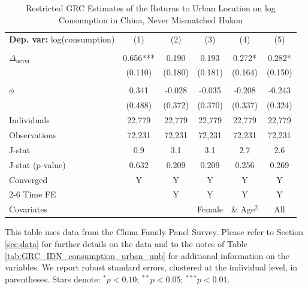 \begin{table}[htbp] \centering \begin{threeparttable}
 \caption{Restricted GRC Estimates of the Returns to Urban Location on log Consumption in China, Never Mismatched Hukou} 
 \label{tab:GRC_CHN_nomis_consumption_urban_unb} 
\begin{tabular}{l ccccc} \toprule  \textbf{Dep. var:}  log(consumption) 
                    &\multicolumn{1}{c}{(1)}   &\multicolumn{1}{c}{(2)}   &\multicolumn{1}{c}{(3)}   &\multicolumn{1}{c}{(4)}   &\multicolumn{1}{c}{(5)}   \\
                    &               &               &               &               &               \\
\addlinespace
$\Delta_{\text{never}}$&       0.656***&       0.190   &       0.193   &       0.272*  &       0.282*  \\
                    &     (0.110)   &     (0.180)   &     (0.181)   &     (0.164)   &     (0.150)   \\
                    &               &               &               &               &               \\
\addlinespace
$\phi$              &       0.341   &      -0.028   &      -0.035   &      -0.208   &      -0.243   \\
                    &     (0.488)   &     (0.372)   &     (0.370)   &     (0.337)   &     (0.324)   \\
\addlinespace
Individuals         &      22,779   &      22,779   &      22,779   &      22,779   &      22,779   \\
Observations        &      72,231   &      72,231   &      72,231   &      72,231   &      72,231   \\
J-stat              &         0.9   &         3.1   &         3.1   &         2.7   &         2.6   \\
J-stat (p-value)    &       0.632   &       0.209   &       0.209   &       0.256   &       0.269   \\
Converged           &           Y   &           Y   &           Y   &           Y   &           Y   \\
\cmidrule{2-6} Time FE & & Y & Y & Y & Y \\ Covariates & & & Female & \& Age$^2$ & All \\ \bottomrule \end{tabular} \begin{tablenotes}[flushleft] \footnotesize \item{This table uses data from the China Family Panel Survey. Please refer to Section \ref{sec:data} for further details on the data and to the notes of Table \ref{tab:GRC_IDN_consumption_urban_unb} for additional information on the variables. We report robust standard errors, clustered at the individual level, in parentheses. Stars denote: $^{*} p<0.10$; $^{**} p<0.05$; $^{***} p<0.01$.} \end{tablenotes} \end{threeparttable} \end{table}
